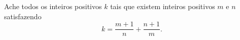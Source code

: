 Ache todos os inteiros positivos $k$ tais que existem inteiros positivos $m$ e $n$ satisfazendo \[ k = \frac{m+1}{n} + \frac{n+1}{m}.\]
